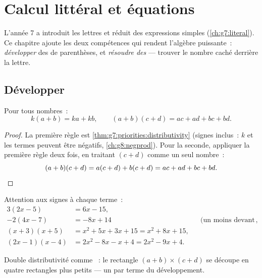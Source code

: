 \chapter{Calcul littéral et équations}\label{ch:g8:equations}

L'année 7 a introduit les lettres et réduit des expressions simples
(\cref{ch:g7:literal}). Ce chapitre ajoute les deux compétences qui
rendent l'algèbre puissante~: \emph{développer} des  de
parenthèses, et \emph{résoudre des } --- trouver le nombre
caché derrière la lettre.

\section{Développer}

\begin{theorem}\label{thm:g8:equations:expand}
Pour tous nombres~:
\[
k(a + b) = ka + kb,
\qquad
(a + b)(c + d) = ac + ad + bc + bd .
\]
\end{theorem}

\begin{proof}
La première règle est \cref{thm:g7:priorities:distributivity} (signes
inclus~: $k$ et les termes peuvent être négatifs,
\cref{ch:g8:negprod}). Pour la seconde, appliquer la première règle
deux fois, en traitant $(c + d)$ comme un seul nombre~:
\[
(a + b)(c + d) = a(c + d) + b(c + d) = ac + ad + bc + bd .
\qedhere
\]
\end{proof}

\begin{example}\label{ex:g8:equations:expand}
Attention aux signes à chaque terme~:
\begin{align*}
3(2x - 5) &= 6x - 15, \\
-2(4x - 7) &= -8x + 14
&& \text{(un moins devant inverse les deux signes)}, \\
(x + 3)(x + 5) &= x^2 + 5x + 3x + 15 = x^2 + 8x + 15, \\
(2x - 1)(x - 4) &= 2x^2 - 8x - x + 4 = 2x^2 - 9x + 4 .
\end{align*}
\end{example}

\begin{omfigure}

{\small Double distributivité comme ~: le rectangle
$(a+b) \times (c+d)$ se découpe en quatre rectangles plus petits ---
un par terme du développement.}
\end{omfigure}

